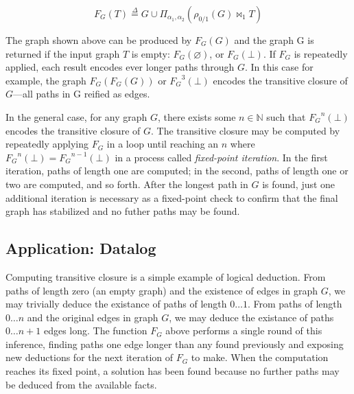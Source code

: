 \[
  F_G(T) \overset{\Delta}{=} G \cup \Pi_{\alpha_1,\alpha_2}(\rho_{0 / 1}(G) \bowtie_1 T)
\]

The graph shown above can be produced by $F_G(G)$ and the graph G is returned if the input graph $T$ is empty: $F_G(\varnothing)$, or $F_G(\bot)$. If $F_G$ is repeatedly applied, each result encodes ever longer paths through $G$. In this case for example, the graph $F_G(F_G(G))$ or ${F_G}^3(\bot)$ encodes the transitive closure of $G$---all paths in G reified as edges.

\begin{center}
\end{center}

In the general case, for any graph $G$, there exists some $n \in \mathbb{N}$ such that ${F_G}^n(\bot)$ encodes the transitive closure of $G$. The transitive closure may be computed by repeatedly applying $F_G$ in a loop until reaching an $n$ where ${F_G}^n(\bot) = {F_G}^{n-1}(\bot)$ in a process called \textit{fixed-point iteration}. In the first iteration, paths of length one are computed; in the second, paths of length one or two are computed, and so forth. After the longest path in $G$ is found, just one additional iteration is necessary as a fixed-point check to confirm that the final graph has stabilized and no futher paths may be found. 


\subsection{Application: Datalog}
\label{sec:ra:tc}
%
Computing transitive closure is a simple example of logical deduction. From paths of length zero (an empty graph) and the existence of edges in graph $G$, we may trivially deduce the existance of paths of length $0 \ldots 1$. From paths of length $0 \ldots n$ and the original edges in graph $G$, we may deduce the existance of paths $0 \ldots n+1$ edges long. The function $F_G$ above performs a single round of this inference, finding paths one edge longer than any found previously and exposing new deductions for the next iteration of $F_G$ to make. When the computation reaches its fixed point, a solution has been found because no further paths may be deduced from the available facts.

